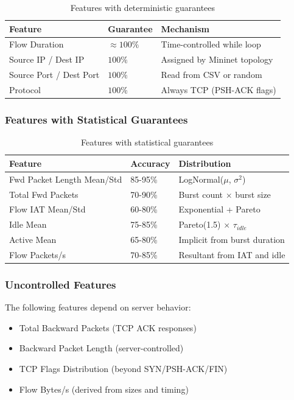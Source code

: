 \documentclass[11pt,a4paper]{article}
\begin{document}
\begin{table}[h]
\centering
\begin{tabular}{@{}lll@{}}
\toprule
\textbf{Feature} & \textbf{Guarantee} & \textbf{Mechanism} \\
\midrule
Flow Duration & $\approx 100\%$ & Time-controlled while loop \\
Source IP / Dest IP & $100\%$ & Assigned by Mininet topology \\
Source Port / Dest Port & $100\%$ & Read from CSV or random \\
Protocol & $100\%$ & Always TCP (PSH-ACK flags) \\
\bottomrule
\end{tabular}
\caption{Features with deterministic guarantees}
\end{table}

\subsubsection{Features with Statistical Guarantees}

\begin{table}[h]
\centering
\begin{tabular}{@{}lll@{}}
\toprule
\textbf{Feature} & \textbf{Accuracy} & \textbf{Distribution} \\
\midrule
Fwd Packet Length Mean/Std & 85-95\% & LogNormal($\mu$, $\sigma^2$) \\
Total Fwd Packets & 70-90\% & Burst count $\times$ burst size \\
Flow IAT Mean/Std & 60-80\% & Exponential + Pareto \\
Idle Mean & 75-85\% & Pareto(1.5) $\times$ $\tau_{idle}$ \\
Active Mean & 65-80\% & Implicit from burst duration \\
Flow Packets/s & 70-85\% & Resultant from IAT and idle \\
\bottomrule
\end{tabular}
\caption{Features with statistical guarantees}
\end{table}

\subsubsection{Uncontrolled Features}

The following features depend on server behavior:
\begin{itemize}
    \item Total Backward Packets (TCP ACK responses)
    \item Backward Packet Length (server-controlled)
    \item TCP Flags Distribution (beyond SYN/PSH-ACK/FIN)
    \item Flow Bytes/s (derived from sizes and timing)
\end{itemize}
\end{document}
